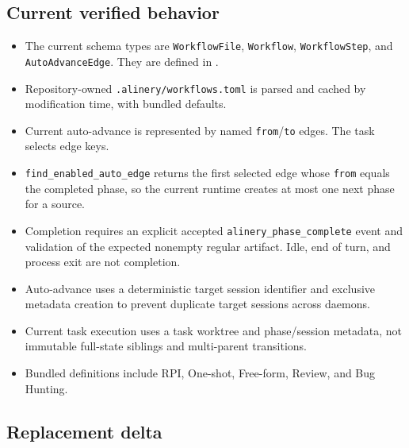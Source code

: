 \documentclass[11pt]{article}
\begin{document}
\subsection{Current verified behavior}

\begin{itemize}
  \item The current schema types are \texttt{WorkflowFile}, \texttt{Workflow}, \texttt{WorkflowStep}, and \texttt{AutoAdvanceEdge}. They are defined in .
  \item Repository-owned \texttt{.alinery/workflows.toml} is parsed and cached by modification time, with bundled defaults.
  \item Current auto-advance is represented by named \texttt{from}/\texttt{to} edges. The task selects edge keys.
  \item \texttt{find\_enabled\_auto\_edge} returns the first selected edge whose \texttt{from} equals the completed phase, so the current runtime creates at most one next phase for a source.
  \item Completion requires an explicit accepted \texttt{alinery\_phase\_complete} event and validation of the expected nonempty regular artifact. Idle, end of turn, and process exit are not completion.
  \item Auto-advance uses a deterministic target session identifier and exclusive metadata creation to prevent duplicate target sessions across daemons.
  \item Current task execution uses a task worktree and phase/session metadata, not immutable full-state siblings and multi-parent transitions.
  \item Bundled definitions include RPI, One-shot, Free-form, Review, and Bug Hunting.
\end{itemize}

\subsection{Replacement delta}
\end{document}
